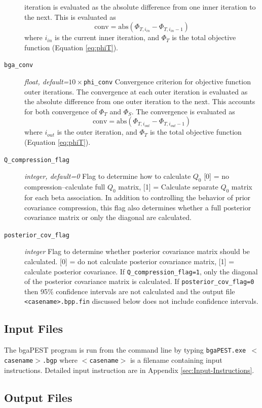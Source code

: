 \documentclass[11pt,oneside,onecolumn]{usgsreport}
\begin{document}
\begin{multicols}{2}
\begin{description}
iteration is evaluated as the absolute difference from one inner iteration
to the next. This is evaluated as
\[
\mathrm{conv}=\mathrm{abs}\left(\Phi_{T,i_{in}}-\Phi_{T,i_{in}-1}\right)
\]
 where\emph{ $i_{in}$ }is the current inner iteration, and $\Phi_{T}$
is the total objective function (Equation \ref{eq:phiT}). 
\item [{\texttt{bga\_conv}}] \emph{float, default=$10\times$}\texttt{phi\_conv}\emph{
}Convergence criterion for objective function outer iterations. The
convergence at each outer iteration is evaluated as the absolute difference
from one outer iteration to the next. This accounts for both convergence
of $\Phi_{T}$ and $\Phi_{S}$. The convergence
is evaluated as 
\[
\mathrm{conv}=\mathrm{abs}\left(\Phi_{T,i_{out}}-\Phi_{T,i_{out}-1}\right)
\]
where $i_{out}$ is the outer iteration, and $\Phi_{T}$
is the total objective function (Equation \ref{eq:phiT}).\emph{ }
\item [{\texttt{Q\_compression\_flag}}] \emph{integer, default=0} Flag
to determine how to calculate $Q_{0}$ {[}0{]} = no compression--calculate
full $Q_{0}$ matrix, {[}1{]} = Calculate separate $Q_{0}$ matrix
for each beta association. In addition to controlling the behavior
of prior covariance compression, this flag also determines whether
a full posterior covariance matrix or only the diagonal are calculated.

\item [{\texttt{posterior\_cov\_flag}}] \emph{integer }Flag to determine
whether posterior covariance matrix should be calculated. {[}0{]}
= do not calculate posterior covariance matrix, {[}1{]} = calculate
posterior covariance. If \texttt{Q\_compression\_flag=1}, only the
diagonal of the posterior covariance matrix is calculated. If \texttt{posterior\_cov\_flag=0}
then 95\% confidence intervals are not calculated and the output file
\texttt{<casename>.bpp.fin} discussed below does not include confidence
intervals.
\end{description}

\subsection{Input Files}

The bgaPEST program is run from the command line by typing \texttt{bgaPEST.exe $<$casename$>$.bgp}
where \texttt{$<$casename$>$} is a filename containing input instructions.
Detailed input instruction are in Appendix \ref{sec:Input-Instructions}.


\subsection{Output Files}


\end{multicols}
\end{document}
